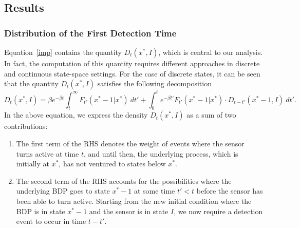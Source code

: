 \subsection{Results}

\subsubsection{Distribution of the First Detection Time}

Equation~\eqref{imp} contains the quantity $D_t(x^*,I)$, which is central to our analysis. In fact, the computation of this quantity requires different approaches in discrete and continuous state-space settings. For the case of discrete states, it can be seen that the quantity $D_t(x^*,I)$ satisfies the following decomposition
\begin{equation}
    D_t(x^*,I) = \beta e^{-\beta t} \int_{t}^{\infty}  F_{t'}(x^*-1|x^*)~dt' + \int_{0}^{t} e^{-\beta t'} F_{t'}(x^*-1|x^*) \cdot D_{t-t'}(x^*-1,I) ~dt'. \label{imp2}
\end{equation}
In the above equation, we express the density $D_t(x^*,I)$ as a sum of two contributions:
\begin{enumerate}
    \item The first term of the RHS denotes the weight of events where the sensor turns active at time $t$, and until then, the underlying process, which is initially at $x^*$, has not ventured to states below $x^*$.
    \item The second term of the RHS accounts for the possibilities where the underlying BDP goes to state $x^*-1$ at some time $t'<t$ before the sensor has been able to turn active. Starting from the new initial condition where the BDP is in state $x^*-1$ and the sensor is in state $I$, we now require a detection event to occur in time $t-t'$.
\end{enumerate}


